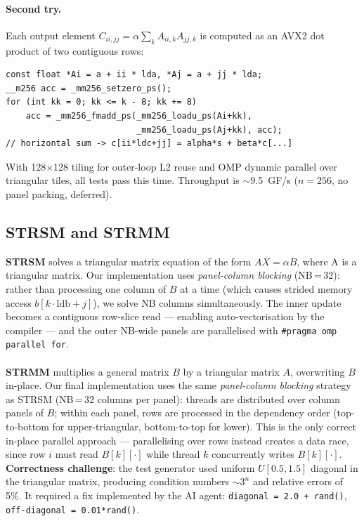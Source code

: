 \documentclass[11pt,a4paper]{article}
\begin{document}
\paragraph{Second try.}
Each output element $C_{ii,jj} = \alpha \sum_k A_{ii,k}A_{jj,k}$ is computed
as an AVX2 dot product of two contiguous rows:
\begin{lstlisting}
const float *Ai = a + ii * lda, *Aj = a + jj * lda;
__m256 acc = _mm256_setzero_ps();
for (int kk = 0; kk <= k - 8; kk += 8)
    acc = _mm256_fmadd_ps(_mm256_loadu_ps(Ai+kk),
                          _mm256_loadu_ps(Aj+kk), acc);
// horizontal sum -> c[ii*ldc+jj] = alpha*s + beta*c[...]
\end{lstlisting}
With 128$\times$128 tiling for outer-loop L2 reuse and OMP dynamic parallel over triangular
tiles, all tests pass this time. Throughput is $\sim$9.5~GF/s ($n=256$, no panel
packing, deferred).

\subsection{STRSM and STRMM}

\textbf{STRSM} solves a triangular matrix equation of the form $AX = \alpha B$, where A is a triangular matrix.
Our implementation uses \emph{panel-column blocking} (NB\,=\,32): rather than processing one column of $B$ at a time
(which causes strided memory access $b[k \cdot \text{ldb} + j]$), we solve NB columns simultaneously.
The inner update becomes a contiguous row-slice read — enabling auto-vectorisation by the compiler — and
the outer NB-wide panels are parallelised with \texttt{\#pragma omp parallel for}.\\\\
\textbf{STRMM} multiplies a general matrix $B$ by a triangular matrix $A$, overwriting $B$ in-place.
Our final implementation uses the same \emph{panel-column blocking} strategy as STRSM (NB\,=\,32 columns per panel):
threads are distributed over column panels of $B$; within each panel, rows are processed in the dependency order
(top-to-bottom for upper-triangular, bottom-to-top for lower).
This is the only correct in-place parallel approach — parallelising over rows instead creates a data race,
since row $i$ must read $B[k][\cdot]$ while thread $k$ concurrently writes $B[k][\cdot]$.\\

\textbf{Correctness challenge}: the test generator used uniform $U[0.5,1.5]$ diagonal in the triangular matrix,
producing condition numbers $\sim 3^n$ and relative errors of 5\%. It required a fix implemented by the AI agent:
\texttt{diagonal = 2.0 + rand()}, \texttt{off-diagonal = 0.01*rand()}.
\end{document}
